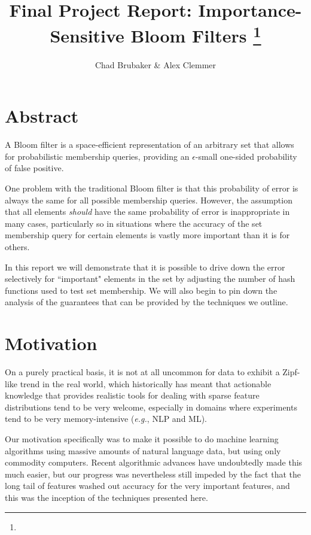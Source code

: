 \documentclass[11pt]{article}
\title{Final Project Report: Importance-Sensitive Bloom Filters
\footnote{\s{CS 6955 Data Mining; \;\; Spring 2012 \hfill
Instructor: Jeff M. Phillips, University of Utah}
}
}
\author{Chad Brubaker \& Alex Clemmer}
\begin{document}
\maketitle






\section*{Abstract}

A Bloom filter is a space-efficient representation of an arbitrary set that allows for probabilistic membership queries, providing an $\epsilon$-small one-sided probability of false positive.

One problem with the traditional Bloom filter is that this probability of error is always the same for all possible membership queries. However, the assumption that all elements \textit{should} have the same probability of error is inappropriate in many cases, particularly so in situations where the accuracy of the set membership query for certain elements is vastly more important than it is for others.

In this report we will demonstrate that it is possible to drive down the error selectively for ``important" elements in the set by adjusting the number of hash functions used to test set membership. We will also begin to pin down the analysis of the guarantees that can be provided by the techniques we outline.

\section{Motivation}

On a purely practical basis, it is not at all uncommon for data to exhibit a Zipf-like trend in the real world, which historically has meant that actionable knowledge that provides realistic tools for dealing with sparse feature distributions tend to be very welcome, especially in domains where experiments tend to be very memory-intensive (\textit{e.g.}, NLP and ML).

Our motivation specifically was to make it possible to do machine learning algorithms using massive amounts of natural language data, but using only commodity computers. Recent algorithmic advances have undoubtedly made this much easier, but our progress was nevertheless still impeded by the fact that the long tail of features washed out accuracy for the very important features, and this was the inception of the techniques presented here.
\end{document}
